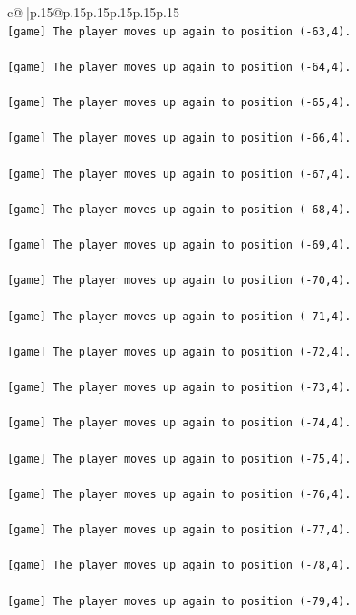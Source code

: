 \documentclass{article}
\begin{document}
{\begin{supertabular}{c@{$\;$}|p{.15\linewidth}@{}p{.15\linewidth}p{.15\linewidth}p{.15\linewidth}p{.15\linewidth}p{.15\linewidth}}
{{{\\ 
\texttt{{[}game{]} The player moves up again to position ({-}63,4).} \\
\\ 
\texttt{{[}game{]} The player moves up again to position ({-}64,4).} \\
\\ 
\texttt{{[}game{]} The player moves up again to position ({-}65,4).} \\
\\ 
\texttt{{[}game{]} The player moves up again to position ({-}66,4).} \\
\\ 
\texttt{{[}game{]} The player moves up again to position ({-}67,4).} \\
\\ 
\texttt{{[}game{]} The player moves up again to position ({-}68,4).} \\
\\ 
\texttt{{[}game{]} The player moves up again to position ({-}69,4).} \\
\\ 
\texttt{{[}game{]} The player moves up again to position ({-}70,4).} \\
\\ 
\texttt{{[}game{]} The player moves up again to position ({-}71,4).} \\
\\ 
\texttt{{[}game{]} The player moves up again to position ({-}72,4).} \\
\\ 
\texttt{{[}game{]} The player moves up again to position ({-}73,4).} \\
\\ 
\texttt{{[}game{]} The player moves up again to position ({-}74,4).} \\
\\ 
\texttt{{[}game{]} The player moves up again to position ({-}75,4).} \\
\\ 
\texttt{{[}game{]} The player moves up again to position ({-}76,4).} \\
\\ 
\texttt{{[}game{]} The player moves up again to position ({-}77,4).} \\
\\ 
\texttt{{[}game{]} The player moves up again to position ({-}78,4).} \\
\\ 
\texttt{{[}game{]} The player moves up again to position ({-}79,4).} \\
}}}
\end{supertabular}}
\end{document}
